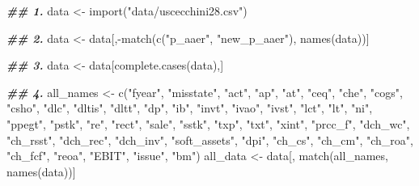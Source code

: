 \documentclass[a4paper, nobind]{templates/ociamthesis}
\newenvironment{Shaded}{\begin{snugshade}}{\end{snugshade}}
\newcommand{\DocumentationTok}[1]{\textcolor[rgb]{0.56,0.35,0.01}{\textbf{\textit{#1}}}}
\newcommand{\FunctionTok}[1]{\textcolor[rgb]{0.00,0.00,0.00}{#1}}
\newcommand{\NormalTok}[1]{#1}
\newcommand{\OtherTok}[1]{\textcolor[rgb]{0.56,0.35,0.01}{#1}}
\newcommand{\SpecialCharTok}[1]{\textcolor[rgb]{0.00,0.00,0.00}{#1}}
\newcommand{\StringTok}[1]{\textcolor[rgb]{0.31,0.60,0.02}{#1}}
\renewenvironment{Shaded}
{
  \vspace{10pt}%
  \begin{snugshade}%
}{%
  \end{snugshade}%
  \vspace{8pt}%
}
\begin{document}
\begin{Shaded}
\begin{Highlighting}[]
\DocumentationTok{\#\# 1.}
\NormalTok{data }\OtherTok{\textless{}{-}} \FunctionTok{import}\NormalTok{(}\StringTok{"data/uscecchini28.csv"}\NormalTok{)}

\DocumentationTok{\#\# 2.}
\NormalTok{data }\OtherTok{\textless{}{-}}\NormalTok{ data[,}\SpecialCharTok{{-}}\FunctionTok{match}\NormalTok{(}\FunctionTok{c}\NormalTok{(}\StringTok{"p\_aaer"}\NormalTok{, }\StringTok{"new\_p\_aaer"}\NormalTok{), }\FunctionTok{names}\NormalTok{(data))]}

\DocumentationTok{\#\# 3.}
\NormalTok{data }\OtherTok{\textless{}{-}}\NormalTok{ data[}\FunctionTok{complete.cases}\NormalTok{(data),]}

\DocumentationTok{\#\# 4.}
\NormalTok{all\_names }\OtherTok{\textless{}{-}} \FunctionTok{c}\NormalTok{(}\StringTok{"fyear"}\NormalTok{, }\StringTok{"misstate"}\NormalTok{, }\StringTok{"act"}\NormalTok{, }\StringTok{"ap"}\NormalTok{, }\StringTok{"at"}\NormalTok{, }\StringTok{"ceq"}\NormalTok{, }\StringTok{"che"}\NormalTok{, }
               \StringTok{"cogs"}\NormalTok{, }\StringTok{"csho"}\NormalTok{, }\StringTok{"dlc"}\NormalTok{, }\StringTok{"dltis"}\NormalTok{, }\StringTok{"dltt"}\NormalTok{, }\StringTok{"dp"}\NormalTok{, }\StringTok{"ib"}\NormalTok{, }
               \StringTok{"invt"}\NormalTok{, }\StringTok{"ivao"}\NormalTok{, }\StringTok{"ivst"}\NormalTok{, }\StringTok{"lct"}\NormalTok{, }\StringTok{"lt"}\NormalTok{, }\StringTok{"ni"}\NormalTok{, }\StringTok{"ppegt"}\NormalTok{, }
               \StringTok{"pstk"}\NormalTok{, }\StringTok{"re"}\NormalTok{, }\StringTok{"rect"}\NormalTok{, }\StringTok{"sale"}\NormalTok{, }\StringTok{"sstk"}\NormalTok{, }\StringTok{"txp"}\NormalTok{, }\StringTok{"txt"}\NormalTok{, }
               \StringTok{"xint"}\NormalTok{, }\StringTok{"prcc\_f"}\NormalTok{, }\StringTok{"dch\_wc"}\NormalTok{, }\StringTok{"ch\_rsst"}\NormalTok{, }\StringTok{"dch\_rec"}\NormalTok{, }
               \StringTok{"dch\_inv"}\NormalTok{, }\StringTok{"soft\_assets"}\NormalTok{, }\StringTok{"dpi"}\NormalTok{, }\StringTok{"ch\_cs"}\NormalTok{, }\StringTok{"ch\_cm"}\NormalTok{, }
               \StringTok{"ch\_roa"}\NormalTok{, }\StringTok{"ch\_fcf"}\NormalTok{, }\StringTok{"reoa"}\NormalTok{, }\StringTok{"EBIT"}\NormalTok{, }\StringTok{"issue"}\NormalTok{, }\StringTok{"bm"}\NormalTok{)}
\NormalTok{all\_data }\OtherTok{\textless{}{-}}\NormalTok{ data[, }\FunctionTok{match}\NormalTok{(all\_names, }\FunctionTok{names}\NormalTok{(data))]}


\end{Highlighting}
\end{Shaded}
\end{document}
